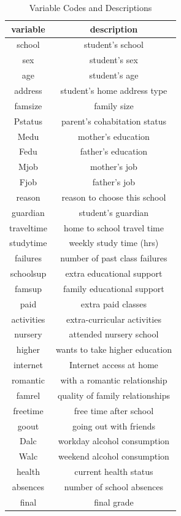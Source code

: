 \documentclass[12pt,english]{article}
\begin{document}
\begin{table}[ht]
\caption{Variable Codes and Descriptions}
\label{tab:descriptions} 
\begin{center}
 \begin{tabular}{|c|c|} 
 \hline
 variable & description  \\ [0.5ex] 
 \hline\hline
 school & student's school \\ 
 \hline 
 sex & student's sex \\
 \hline 
age & student's age \\
\hline  
address & student's home address type\\
 \hline 
 famsize & family size \\
 \hline 
 Pstatus & parent's cohabitation status \\
\hline  
Medu & mother's education \\
\hline  
Fedu & father's education\\
 \hline 
 Mjob & mother's job \\
 \hline 
 Fjob & father's job \\
\hline 
reason & reason to choose this school\\
\hline 
guardian & student's guardian\\
\hline 
traveltime & home to school travel time\\
\hline 
studytime & weekly study time (hrs)\\
\hline 
failures & number of past class failures\\
\hline 
schoolsup & extra educational support \\
\hline 
famsup & family educational support \\
\hline 
paid & extra paid classes \\
\hline 
activities & extra-curricular activities \\
\hline 
nursery & attended nursery school\\
\hline 
higher & wants to take higher education \\
\hline 
 internet & Internet access at home \\
 \hline 
romantic & with a romantic relationship \\
\hline 
famrel & quality of family relationships \\
\hline 
freetime & free time after school\\ 
\hline 
goout & going out with friends \\
\hline 
Dalc & workday alcohol consumption  \\
\hline
Walc & weekend alcohol consumption\\
\hline 
health & current health status \\
\hline 
absences & number of school absences\\
\hline 
final & final grade\\
\hline
\end{tabular}
\end{center}
\end{table}
\pagebreak
\end{document}
